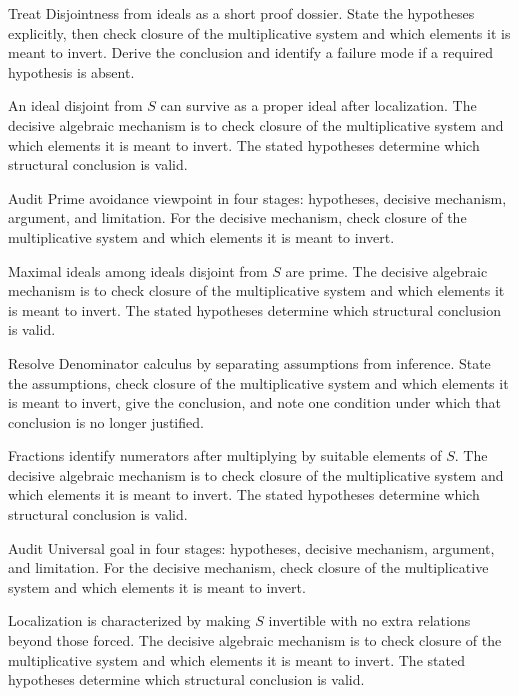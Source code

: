 \begin{problem}\label{prob:v05-problem-04}
Treat Disjointness from ideals as a short proof dossier. State the hypotheses explicitly, then check closure of the multiplicative system and which elements it is meant to invert. Derive the conclusion and identify a failure mode if a required hypothesis is absent.
\end{problem}
\begin{solution}
An ideal disjoint from $S$ can survive as a proper ideal after localization. The decisive algebraic mechanism is to check closure of the multiplicative system and which elements it is meant to invert. The stated hypotheses determine which structural conclusion is valid.
\end{solution}

\begin{problem}\label{prob:v05-problem-05}
Audit Prime avoidance viewpoint in four stages: hypotheses, decisive mechanism, argument, and limitation. For the decisive mechanism, check closure of the multiplicative system and which elements it is meant to invert.
\end{problem}
\begin{solution}
Maximal ideals among ideals disjoint from $S$ are prime. The decisive algebraic mechanism is to check closure of the multiplicative system and which elements it is meant to invert. The stated hypotheses determine which structural conclusion is valid.
\end{solution}

\begin{problem}\label{prob:v05-problem-06}
Resolve Denominator calculus by separating assumptions from inference. State the assumptions, check closure of the multiplicative system and which elements it is meant to invert, give the conclusion, and note one condition under which that conclusion is no longer justified.
\end{problem}
\begin{solution}
Fractions identify numerators after multiplying by suitable elements of $S$. The decisive algebraic mechanism is to check closure of the multiplicative system and which elements it is meant to invert. The stated hypotheses determine which structural conclusion is valid.
\end{solution}

\begin{problem}\label{prob:v05-problem-07}
Audit Universal goal in four stages: hypotheses, decisive mechanism, argument, and limitation. For the decisive mechanism, check closure of the multiplicative system and which elements it is meant to invert.
\end{problem}
\begin{solution}
Localization is characterized by making $S$ invertible with no extra relations beyond those forced. The decisive algebraic mechanism is to check closure of the multiplicative system and which elements it is meant to invert. The stated hypotheses determine which structural conclusion is valid.
\end{solution}


